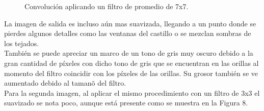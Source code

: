 \documentclass[conference]{IEEEtran}
\begin{document}
\begin{figure}[h]
	\centering
	\caption{Convoluci\'on aplicando un filtro de promedio de 7x7.}
\end{figure}

La imagen de salida es incluso a\'un mas suavizada, llegando a un punto donde se pierdes algunos detalles como las ventanas del castillo o se mezclan sombras de los tejados.\\
Tambi\'en se puede apreciar un marco de un tono de gris muy oscuro debido a la gran cantidad de p\'ixeles con dicho tono de gris que se encuentran en las orillas al momento del filtro coincidir con los p\'ixeles de las orillas. Su grosor tambi\'en se ve aumentado debido al taman\~o del filtro.\\

Para la segunda imagen, al aplicar el mismo procedimiento con un filtro de 3x3 el suavizado se nota poco, aunque est\'a presente como se muestra en la Figura 8.\\
\end{document}
